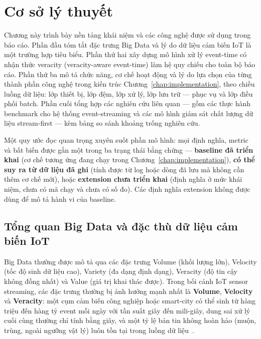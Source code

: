\chapter{Cơ sở lý thuyết}
\label{chap:background}

Chương này trình bày nền tảng khái niệm và các công nghệ được sử dụng trong
báo cáo. Phần đầu tóm tắt đặc trưng Big Data và lý do dữ liệu cảm biến IoT
là một trường hợp tiêu biểu. Phần thứ hai xây dựng mô hình xử lý event-time
có nhận thức veracity (veracity-aware event-time) làm hệ quy chiếu cho toàn
bộ báo cáo. Phần thứ ba mô tả chức năng, cơ chế hoạt động và lý do lựa chọn
của từng thành phần công nghệ trong kiến trúc
Chương~\ref{chap:implementation}, theo chiều luồng dữ liệu: lớp thiết bị,
lớp đệm, lớp xử lý, lớp lưu trữ --- phục vụ và lớp điều phối batch. Phần
cuối tổng hợp các nghiên cứu liên quan --- gồm các thực hành benchmark cho
hệ thống event-streaming và các mô hình giám sát chất lượng dữ liệu
stream-first --- kèm bảng so sánh khoảng trống nghiên cứu.

Một quy ước đọc quan trọng xuyên suốt phần mô hình: mọi định nghĩa, metric
và bất biến được gắn một trong ba trạng thái bằng chứng --- \textbf{baseline
đã triển khai} (cơ chế tương ứng đang chạy trong
Chương~\ref{chap:implementation}), \textbf{có thể suy ra từ dữ liệu đã ghi}
(tính được từ log hoặc dòng đã lưu mà không cần thêm cơ chế mới), hoặc
\textbf{extension chưa triển khai} (định nghĩa ở mức khái niệm, chưa có mã
chạy và chưa có số đo). Các định nghĩa extension không được dùng để mô tả
hành vi của baseline.

\section{Tổng quan Big Data và đặc thù dữ liệu cảm biến IoT}
\label{sec:bigdata-overview}

Big Data thường được mô tả qua các đặc trưng Volume (khối lượng lớn),
Velocity (tốc độ sinh dữ liệu cao), Variety (đa dạng định dạng),
Veracity (độ tin cậy không đồng nhất) và Value (giá trị khai thác được).
Trong bối cảnh IoT sensor streaming, các đặc trưng thường bị ảnh hưởng mạnh
nhất là \textbf{Volume}, \textbf{Velocity} và \textbf{Veracity}: một cụm cảm
biến công nghiệp hoặc smart-city có thể sinh từ hàng triệu đến hàng tỷ event
mỗi ngày với
tần suất giây đến mili-giây, dung sai xử lý cuối cùng thường chỉ tính bằng
giây, và một tỷ lệ bản tin không hoàn hảo (muộn, trùng, ngoài ngưỡng vật
lý) luôn tồn tại trong luồng dữ liệu~\cite{iot_big_data_survey_2022}.

